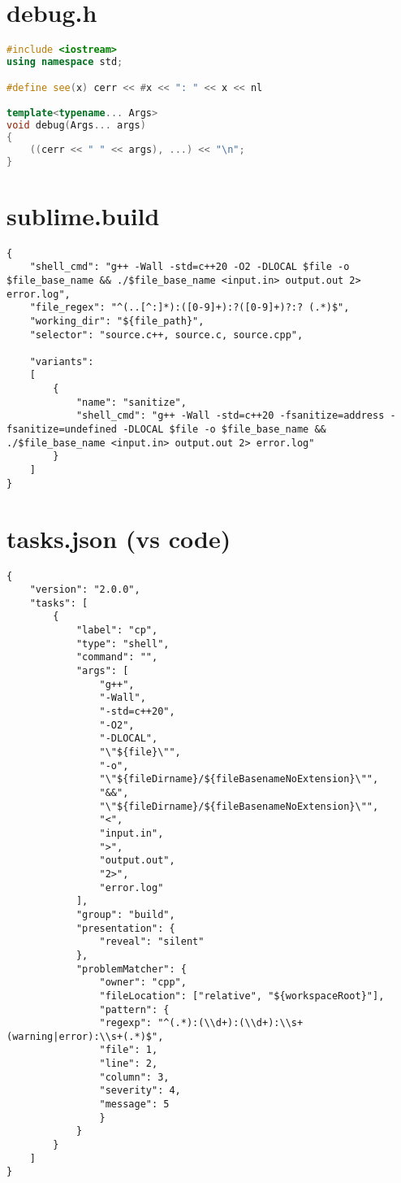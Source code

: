 \section{debug.h}
\begin{lstlisting}[language=C++]
#include <iostream>
using namespace std;

#define see(x) cerr << #x << ": " << x << nl

template<typename... Args>
void debug(Args... args)
{
    ((cerr << " " << args), ...) << "\n";
}
\end{lstlisting}
\sectionend

\section{sublime.build}
\begin{lstlisting}
{
    "shell_cmd": "g++ -Wall -std=c++20 -O2 -DLOCAL $file -o $file_base_name && ./$file_base_name <input.in> output.out 2> error.log",
    "file_regex": "^(..[^:]*):([0-9]+):?([0-9]+)?:? (.*)$",
    "working_dir": "${file_path}",
    "selector": "source.c++, source.c, source.cpp",

    "variants":
    [
        {
            "name": "sanitize",
            "shell_cmd": "g++ -Wall -std=c++20 -fsanitize=address -fsanitize=undefined -DLOCAL $file -o $file_base_name && ./$file_base_name <input.in> output.out 2> error.log"
        }
    ]
}

\end{lstlisting}
\sectionend

\section{tasks.json (vs code)}
\begin{lstlisting}
{
    "version": "2.0.0",
    "tasks": [
        {
            "label": "cp",
            "type": "shell",
            "command": "",
            "args": [
                "g++",
                "-Wall",
                "-std=c++20",
                "-O2",
                "-DLOCAL",
                "\"${file}\"",
                "-o",
                "\"${fileDirname}/${fileBasenameNoExtension}\"",
                "&&",
                "\"${fileDirname}/${fileBasenameNoExtension}\"",
                "<",
                "input.in",
                ">",
                "output.out",
                "2>",
                "error.log"
            ],
            "group": "build",
            "presentation": {
                "reveal": "silent"
            },
            "problemMatcher": {
                "owner": "cpp",
                "fileLocation": ["relative", "${workspaceRoot}"],
                "pattern": {
                "regexp": "^(.*):(\\d+):(\\d+):\\s+(warning|error):\\s+(.*)$",
                "file": 1,
                "line": 2,
                "column": 3,
                "severity": 4,
                "message": 5
                }
            }
        }
    ]
}
\end{lstlisting}
\sectionend

